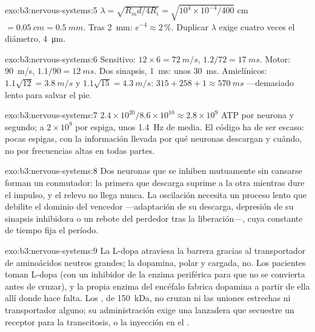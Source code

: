 \begin{solution}{exo:b3:nervous-systems:5}
$\lambda = \sqrt{R_{m}d/4R_{i}} = \sqrt{10^{4}\times 10^{-4}/400}$ cm
$= \qty{0.05}{cm} = \qty{0.5}{mm}$. Tras \qty{2}{mm}: $e^{-4} \approx
2\,\%$. Duplicar $\lambda$ exige cuatro veces el diámetro,
\qty{4}{\micro m}.
\end{solution}

\begin{solution}{exo:b3:nervous-systems:6}
Sensitivo: $12\times 6 = \qty{72}{m/s}$, $1.2/72 = \qty{17}{ms}$. Motor:
\qty{90}{m/s}, $1.1/90 = \qty{12}{ms}$. Dos sinapsis, \qty{1}{ms}: unos
\qty{30}{ms}. Amielínicos: $1.1\sqrt{12} = \qty{3.8}{m/s}$ y
$1.1\sqrt{15} = \qty{4.3}{m/s}$: $315 + 258 + 1 \approx \qty{570}{ms}$
---demasiado lento para salvar el pie.
\end{solution}

\begin{solution}{exo:b3:nervous-systems:7}
$2.4\times 10^{20}/8.6\times 10^{10} \approx 2.8\times 10^{9}$ ATP por
neurona y segundo; a $2\times 10^{9}$ por espiga, unos \qty{1.4}{Hz} de
media. El código ha de ser escaso: pocas espigas, con la información
llevada por qué neuronas descargan y cuándo, no por frecuencias altas
en todas partes.
\end{solution}

\begin{solution}{exo:b3:nervous-systems:8}
Dos neuronas que se inhiben mutuamente sin cansarse forman un
conmutador: la primera que descarga suprime a la otra mientras dure el
impulso, y el relevo no llega nunca. La oscilación necesita un proceso
lento que debilite el dominio del vencedor ---adaptación de su
descarga, depresión de su sinapsis inhibidora o un rebote del perdedor
tras la liberación---, cuya constante de tiempo fija el período.
\end{solution}

\begin{solution}{exo:b3:nervous-systems:9}
La L-dopa atraviesa la barrera gracias al transportador de aminoácidos
neutros grandes; la dopamina, polar y cargada, no. Los pacientes toman
L-dopa (con un inhibidor de la enzima periférica para que no se
convierta antes de cruzar), y la propia enzima del encéfalo fabrica
dopamina a partir de ella allí donde hace falta. Los , de
\qty{150}{kDa}, no cruzan ni las uniones estrechas ni transportador
alguno; su administración exige una lanzadera que secuestre un receptor
para la transcitosis, o la inyección en el .
\end{solution}

